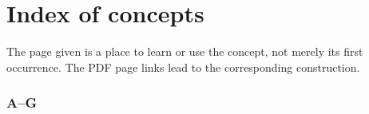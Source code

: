 \chapter*{Index of concepts}
The page given is a place to learn or use the concept, not merely its first occurrence. The PDF page links lead to the corresponding construction.
\newcommand{\fentry}[2]{\par\noindent\hangindent=1em\hangafter=1 #1, \pageref{#2}\par}
\newcommand{\fcontinued}[3]{\par\noindent\hangindent=1em\hangafter=1 #1, \pageref{#2}, \pageref{#3}\par}
\begingroup\setlength{\columnsep}{1.7em}\raggedright
\subsection*{A--G}
